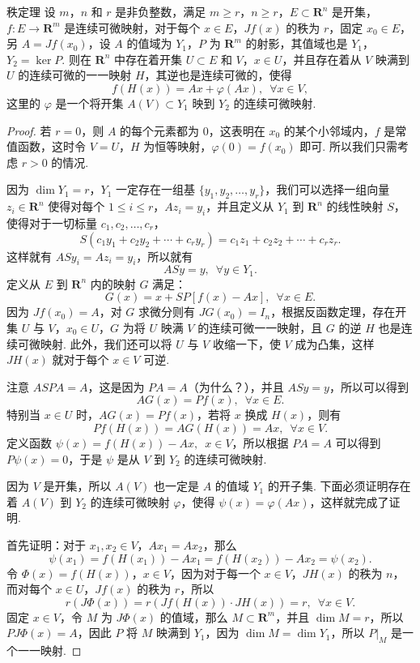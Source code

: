 \begin{theorem}{秩定理}{}
    设 $m$，$n$ 和 $r$ 是非负整数，满足 $m \geqslant r$，$n\geqslant r$，$E \subset \mathbf{R}^n$ 是开集，$f \colon E \to \mathbf{R}^m$ 是连续可微映射，对于每个 $x\in E$，$Jf(x)$ 的秩为 $r$，固定 $x_0\in E$，另 $A = Jf(x_0)$，设 $A$ 的值域为 $Y_1$，$P$ 为 $\mathbf{R}^m$ 的射影，其值域也是 $Y_1$，$Y_2 = \ker P$. 则在 $\mathbf{R}^n$ 中存在着开集 $U\subset E$ 和 $V$，$x \in U$，并且存在着从 $V$ 映满到 $U$ 的连续可微的一一映射 $H$，其逆也是连续可微的，使得 \[f(H(x)) = Ax + \varphi(Ax), \enspace \forall x\in V,\]
    这里的 $\varphi$ 是一个将开集 $A(V)\subset Y_1$ 映到 $Y_2$ 的连续可微映射.
\end{theorem}

\begin{proof}
    若 $r = 0$，则 $A$ 的每个元素都为 $0$，这表明在 $x_0$ 的某个小邻域内，$f$ 是常值函数，这时令 $V = U$，$H$ 为恒等映射，$\varphi(0) = f(x_0)$ 即可. 所以我们只需考虑 $r > 0$ 的情况.

    因为 $\dim Y_1 = r$，$Y_1$ 一定存在一组基 $\{y_1, y_2, \ldots, y_r\}$，我们可以选择一组向量 $z_i\in \mathbf{R}^n$ 使得对每个 $1 \leqslant i \leqslant r$，$Az_i = y_i$，并且定义从 $Y_1$ 到 $\mathbf{R}^n$ 的线性映射 $S$，使得对于一切标量 $c_1, c_2, \ldots, c_r$，\[S(c_1y_1 + c_2y_2 + \cdots + c_ry_r) = c_1z_1 + c_2z_2 + \cdots + c_rz_r.\]
    这样就有 $ASy_i = Az_i = y_i$，所以就有 \[ASy = y, \enspace \forall y\in Y_1.\]
    定义从 $E$ 到 $\mathbf{R}^n$ 内的映射 $G$ 满足：\[G(x) = x + SP[f(x) - Ax], \enspace \forall x\in E.\]
    因为 $Jf(x_0) = A$，对 $G$ 求微分则有 $JG(x_0) = I_n$，根据反函数定理，存在开集 $U$ 与 $V$，$x_0\in U$，$G$ 为将 $U$ 映满 $V$ 的连续可微一一映射，且 $G$ 的逆 $H$ 也是连续可微映射. 此外，我们还可以将 $U$ 与 $V$ 收缩一下，使 $V$ 成为凸集，这样 $JH(x)$ 就对于每个 $x\in V$ 可逆.

    注意 $ASPA = A$，这是因为 $PA = A$（为什么？），并且 $ASy = y$，所以可以得到 \[AG(x) = Pf(x), \enspace \forall x\in E.\]
    特别当 $x\in U$ 时，$AG(x) = Pf(x)$，若将 $x$ 换成 $H(x)$，则有 \[Pf(H(x)) = AG(H(x)) = Ax, \enspace \forall x\in V.\]
    定义函数 $\psi(x) = f(H(x)) - Ax, \enspace x\in V$，所以根据 $PA = A$ 可以得到 $P\psi(x) = 0$，于是 $\psi$ 是从 $V$ 到 $Y_2$ 的连续可微映射.

    因为 $V$ 是开集，所以 $A(V)$ 也一定是 $A$ 的值域 $Y_1$ 的开子集. 下面必须证明存在着 $A(V)$ 到 $Y_2$ 的连续可微映射 $\varphi$，使得 $\psi(x) = \varphi(Ax)$，这样就完成了证明.

    首先证明：对于 $x_1, x_2\in V$，$Ax_1 = Ax_2$，那么 \[\psi(x_1) = f(H(x_1)) - Ax_1 = f(H(x_2)) - Ax_2 = \psi(x_2).\]
    令 $\Phi(x) = f(H(x))$，$x\in V$，因为对于每一个 $x\in V$，$JH(x)$ 的秩为 $n$，而对每个 $x\in U$，$Jf(x)$ 的秩为 $r$，所以 \[r(J\Phi(x)) = r(Jf(H(x))\cdot JH(x)) = r, \enspace \forall x \in V.\]
    固定 $x\in V$，令 $M$ 为 $J\Phi(x)$ 的值域，那么 $M\subset \mathbf{R}^m$，并且 $\dim M = r$，所以 $PJ\Phi(x) = A$，因此 $P$ 将 $M$ 映满到 $Y_1$，因为 $\dim M = \dim Y_1$，所以 $\left.P\right|_{M}$ 是一个一一映射.


\end{proof}
